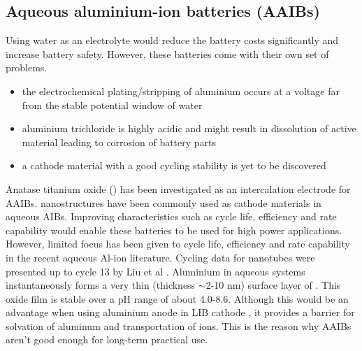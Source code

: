 \subsection{Aqueous aluminium-ion batteries (AAIBs)}
Using water as an electrolyte would reduce the battery costs significantly and increase battery safety. However, these batteries come with their own set of problems. 

\begin{itemize}
    \item the electrochemical plating/stripping of aluminium occurs at a voltage far from the stable potential window of water
    \item aluminium trichloride  is highly acidic and might result in dissolution of active material leading to corrosion of battery parts
    \item a cathode material with a good cycling stability is yet to be discovered
\end{itemize}  

Anatase titanium oxide () has been investigated as an intercalation electrode for AAIBs.  nanostructures have been commonly used as cathode materials in aqueous AIBs. Improving characteristics such as cycle life, efficiency and rate capability would enable these batteries to be used for high power applications. However, limited focus has been given to cycle life, efficiency and rate capability in the recent aqueous Al-ion literature. Cycling data for  nanotubes were presented up to cycle 13 by Liu et al \cite{liu_aluminum_2012}.  %
Aluminium in aqueous systems instantaneously forms a very thin (thickness $\sim$2-10 nm) surface layer of  \cite{vargel_translated_2004}. This oxide film is stable over a pH range of about 4.0-8.6. Although this would be an advantage when using aluminium anode in LIB cathode \cite{myung_electrochemical_2011}, it provides a barrier for solvation of aluminum and transportation of  ions. This is the reason why AAIBs aren't good enough for long-term practical use.

